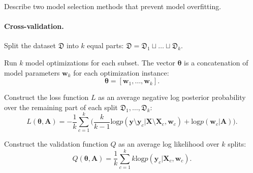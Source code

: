 \documentclass[smallextended]{svjour3}
\begin{document}
Describe two model selection methods that prevent model overfitting.

\paragraph{Cross-validation.}
Split the dataset  $\mathfrak{D}$ into $k$ equal parts:
$
\mathfrak{D} = \mathfrak{D}_1 \sqcup \dots \sqcup \mathfrak{D}_k.
$


Run $k$ model optimizations for each subset. The vector $\boldsymbol{\theta}$ is a concatenation of model parameters $\mathbf{w}_k$ for each optimization instance:
\[
\boldsymbol{\theta} = [\mathbf{w}_1, \dots, \mathbf{w}_k].
\]
 
Construct the loss function $L$ as an average negative log posterior probability over the remaining part of each split $\mathfrak{D}_1, \dots, \mathfrak{D}_k$:  
\begin{equation}
\label{eq:cv}
L(\boldsymbol{\theta}, \mathbf{A}) = -\frac{1}{k}\sum_{c=1}^k \bigl(\frac{k}{k-1}\text{log}p(\mathbf{y} \setminus \mathbf{y}_c|\mathbf{X}\setminus \mathbf{X}_c, \mathbf{w}_c) + \text{log}p(\mathbf{w}_c|\mathbf{A})\bigr).
\end{equation}

Construct the validation function $Q$ as an average log likelihood over $k$ splits:
\[
Q(\boldsymbol{\theta}, \mathbf{A}) = \frac{1}{k}\sum_{c=1}^k k\text{log}p(\mathbf{y}_c|\mathbf{X}_c, \mathbf{w}_c).
\]
\end{document}
